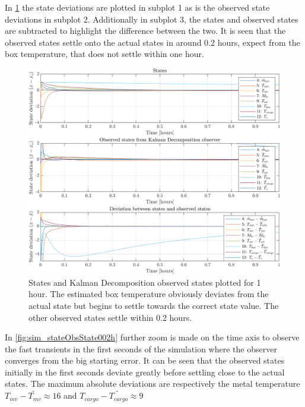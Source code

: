 \newpage
\noindent In \cref{fig:sim_stateObsState1h} the state deviations are plotted in subplot 1 as is the observed state deviations in subplot 2. Additionally in subplot 3, the states and observed states are subtracted to highlight the difference between the two. It is seen that the observed states settle onto the actual states in around 0.2 hours, expect from the box temperature, that does not settle within one hour.

\begin{figure}[h!]
	\centering
	\includegraphics[width=1\textwidth]{Graphics/fig_stateObsState1h.png}
	\caption{States and Kalman Decomposition observed states plotted for 1 hour. The estimated box temperature obviously deviates from the actual state but begins to settle towards the correct state value. The other observed states settle within 0.2 hours.}
	\label{fig:sim_stateObsState1h}
\end{figure}

\newpage
\noindent In \cref{fig:sim_stateObsState002h} further zoom is made on the time axis to observe the fast transients in the first seconds of the simulation where the observer converges from the big starting error. It can be seen that the observed states initially in the first seconds deviate greatly before settling close to the actual states. The maximum absolute deviations are respectively the metal temperature $ T_{mv} - \tilde{T_{mv}} \approx 16$ and $ T_{cargo} - \tilde{T_{cargo}} \approx 9 $

